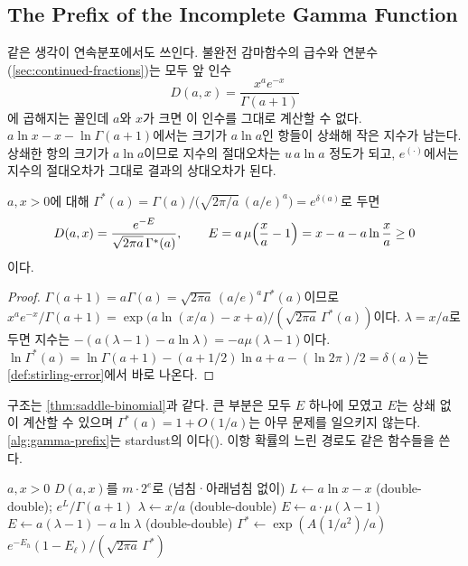 \subsection{The Prefix of the Incomplete Gamma Function}

같은 생각이 연속분포에서도 쓰인다. 불완전 감마함수의 급수와 연분수(\cref{sec:continued-fractions})는 모두 앞 인수
\[
D(a,x)=\frac{x^ae^{-x}}{\Gamma(a+1)}
\]
에 곱해지는 꼴인데 $a$와 $x$가 크면 이 인수를 그대로 계산할 수 없다. $a\ln x-x-\ln\Gamma(a+1)$에서는 크기가 $a\ln a$인 항들이 상쇄해 작은 지수가 남는다. 상쇄한 항의 크기가 $a\ln a$이므로 지수의 절대오차는 $u\,a\ln a$ 정도가 되고, $e^{(\cdot)}$에서는 지수의 절대오차가 그대로 결과의 상대오차가 된다.

\begin{proposition}[Temme의 꼴]
\label{prop:gamma-prefix}
$a,x>0$에 대해 $\Gamma^*(a)=\Gamma(a)/\bigl(\sqrt{2\pi/a}\,(a/e)^a\bigr)=e^{\delta(a)}$로 두면
\[
D(a,x)=\frac{e^{-E}}{\sqrt{2\pi a}\,\Gamma^*(a)},\qquad E=a\,\mu\Bigl(\frac xa-1\Bigr)=x-a-a\ln\frac xa\ge0
\]
이다.
\end{proposition}

\begin{proof}
$\Gamma(a+1)=a\Gamma(a)=\sqrt{2\pi a}\,(a/e)^a\Gamma^*(a)$이므로 $x^ae^{-x}/\Gamma(a+1)=\exp\bigl(a\ln(x/a)-x+a\bigr)/(\sqrt{2\pi a}\,\Gamma^*(a))$이다. $\lambda=x/a$로 두면 지수는 $-(a(\lambda-1)-a\ln\lambda)=-a\mu(\lambda-1)$이다. $\ln\Gamma^*(a)=\ln\Gamma(a+1)-(a+1/2)\ln a+a-(\ln2\pi)/2=\delta(a)$는 \cref{def:stirling-error}에서 바로 나온다.
\end{proof}

구조는 \cref{thm:saddle-binomial}과 같다. 큰 부분은 모두 $E$ 하나에 모였고 $E$는 상쇄 없이 계산할 수 있으며 $\Gamma^*(a)=1+O(1/a)$는 아무 문제를 일으키지 않는다. \cref{alg:gamma-prefix}는 stardust의 이다(). 이항 확률의 느린 경로도 같은 함수들을 쓴다.

\begin{algorithm}[htbp]
\begin{algorithmic}[1]
\Require $a,x>0$
\Ensure $D(a,x)$를 $m\cdot2^e$로 (넘침·아래넘침 없이)
 
  \State $L\gets a\ln x-x$ (double-double); \Return $e^{L}/\Gamma(a+1)$ 
\EndIf
\State $\lambda\gets x/a$ (double-double)
 $E\gets a\cdot\mu(\lambda-1)$ 
\Else\ $E\gets a(\lambda-1)-a\ln\lambda$ (double-double)
\EndIf
\State $\Gamma^*\gets\exp(A(1/a^2)/a)$ 
\State \Return $e^{-E_h}(1-E_\ell)/(\sqrt{2\pi a}\,\Gamma^*)$ 
\end{algorithmic}
\caption{불완전 감마함수의 앞 인수 (stardust )}
\label{alg:gamma-prefix}
\end{algorithm}

